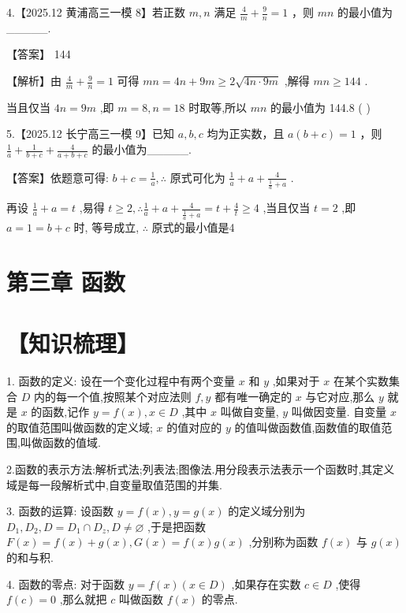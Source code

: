 \documentclass[10pt]{article}
\begin{document}
4.【2025.12 黄浦高三一模 8】若正数 \(m,n\) 满足 \(\frac{4}{m} + \frac{9}{n} = 1\) ，则 \({mn}\) 的最小值为\_\_\_\_\_.

【答案】 144

【解析】由 \(\frac{4}{m} + \frac{9}{n} = 1\) 可得 \({mn} = {4n} + {9m} \geq  2\sqrt{{4n} \cdot  {9m}}\) ,解得 \({mn} \geq  {144}\) .

当且仅当 \({4n} = {9m}\) ,即 \(m = 8,n = {18}\) 时取等,所以 \({mn}\) 的最小值为 144.8 (   )

5.【2025.12 长宁高三一模 9】已知 \(a,b,c\) 均为正实数，且 \(a\left( {b + c}\right)  = 1\) ，则 \(\frac{1}{a} + \frac{1}{b + c} + \frac{4}{a + b + c}\) 的最小值为\_\_\_\_\_.

【答案】依题意可得: \(b + c = \frac{1}{a},\therefore\) 原式可化为 \(\frac{1}{a} + a + \frac{4}{\frac{1}{a} + a}\) .

再设 \(\frac{1}{a} + a = t\) ,易得 \(t \geq  2,\therefore \frac{1}{a} + a + \frac{4}{\frac{1}{a} + a} = t + \frac{4}{t} \geq  4\) ,当且仅当 \(t = 2\) ,即 \(a = 1 = b + c\) 时, 等号成立, \(\therefore\) 原式的最小值是4

\section*{第三章 函数}

\section*{【知识梳理】}

1. 函数的定义: 设在一个变化过程中有两个变量 \(x\) 和 \(y\) ,如果对于 \(x\) 在某个实数集合 \(D\) 内的每一个值,按照某个对应法则 \(f,y\) 都有唯一确定的 \(x\) 与它对应,那么 \(y\) 就是 \(x\) 的函数,记作 \(y = f\left( x\right) ,x \in  D\) ,其中 \(x\) 叫做自变量, \(y\) 叫做因变量. 自变量 \(x\) 的取值范围叫做函数的定义域; \(x\) 的值对应的 \(y\) 的值叫做函数值,函数值的取值范围,叫做函数的值域.

2.函数的表示方法:解析式法;列表法;图像法.用分段表示法表示一个函数时,其定义域是每一段解析式中,自变量取值范围的并集.

3. 函数的运算: 设函数 \(y = f\left( x\right) ,y = g\left( x\right)\) 的定义域分别为 \({D}_{1},{D}_{2},D = {D}_{1} \cap  {D}_{z},D \neq  \varnothing\) ,于是把函数 \(F\left( x\right)  = f\left( x\right)  + g\left( x\right) ,G\left( x\right)  = f\left( x\right) g\left( x\right)\) ,分别称为函数 \(f\left( x\right)\) 与 \(g\left( x\right)\) 的和与积.

4. 函数的零点: 对于函数 \(y = f\left( x\right) \left( {x \in  D}\right)\) ,如果存在实数 \(c \in  D\) ,使得 \(f\left( c\right)  = 0\) ,那么就把 \(c\) 叫做函数 \(f\left( x\right)\) 的零点.
\end{document}
